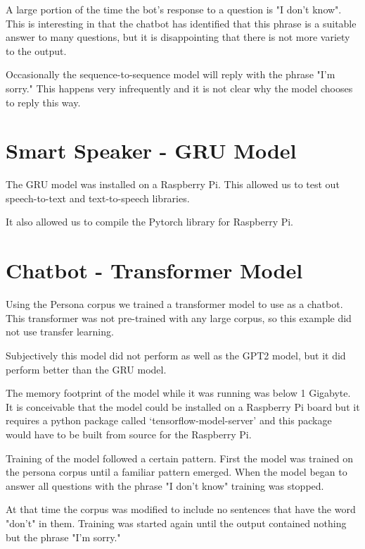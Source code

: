 A large portion of the time the bot's 
response to a question is "I don't know". This is interesting in that the chatbot has identified that this phrase is a suitable answer to many questions, but it is disappointing that there is not more variety to the output.  

Occasionally the sequence-to-sequence model will reply with the phrase "I'm sorry." This happens
very infrequently and it is not clear why the model chooses to reply this way. 

\section{Smart Speaker - GRU Model}

The GRU model was installed on a Raspberry Pi. This allowed us to test out speech-to-text and 
text-to-speech libraries. 

It also allowed us to compile the Pytorch library for Raspberry Pi.



\section{Chatbot - Transformer Model}
Using the Persona corpus we trained a transformer model to use as a chatbot. This transformer was not pre-trained with any large corpus, so this example did not use transfer learning. 

Subjectively this model did not perform as well as the GPT2 model, but it did perform better than the GRU model.

The memory footprint of the model while it was running was below 1 Gigabyte. It is conceivable that the model could be installed on a Raspberry Pi board but it requires a python package called `tensorflow-model-server' and this package would have to be built from source for the Raspberry Pi. 

Training of the model followed a certain pattern. First the model was trained on the persona corpus until a familiar pattern emerged. When the model began to answer all questions with the 
phrase "I don't know" training was stopped. 

At that time the corpus was modified to include no 
sentences that have the word "don't" in them. Training was started again until the output contained nothing but the phrase "I'm sorry." 

